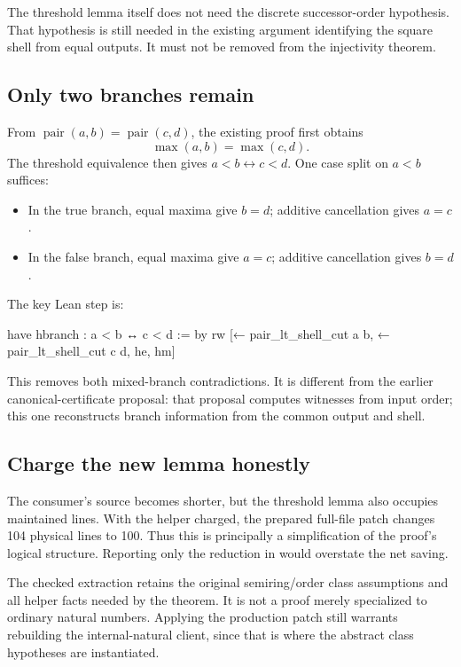 \documentclass[11pt,letterpaper]{article}
\newcommand{\code}[1]{\texttt{\detokenize{#1}}}
\begin{document}
The threshold lemma itself does not need the discrete successor-order hypothesis. That hypothesis is still needed in the existing argument identifying the square shell from equal outputs. It must not be removed from the injectivity theorem.

\subsection{Only two branches remain}

From $\operatorname{pair}(a,b)=\operatorname{pair}(c,d)$, the existing proof first obtains
\[
 \max(a,b)=\max(c,d).
\]
The threshold equivalence then gives $a<b\leftrightarrow c<d$. One case split on $a<b$ suffices:

\begin{itemize}
\item In the true branch, equal maxima give $b=d$; additive cancellation gives $a=c$.
\item In the false branch, equal maxima give $a=c$; additive cancellation gives $b=d$.
\end{itemize}

The key Lean step is:

\begin{Lean}
  have hbranch : a < b ↔ c < d := by
    rw [← pair_lt_shell_cut a b, ← pair_lt_shell_cut c d, he, hm]
\end{Lean}

This removes both mixed-branch contradictions. It is different from the earlier canonical-certificate proposal: that proposal computes witnesses from input order; this one reconstructs branch information from the common output and shell.

\subsection{Charge the new lemma honestly}

The consumer's source becomes shorter, but the threshold lemma also occupies maintained lines. With the helper charged, the prepared full-file patch changes 104 physical lines to 100. Thus this is principally a simplification of the proof's logical structure. Reporting only the reduction in \code{pair_eq_pair_iff} would overstate the net saving.

The checked extraction retains the original semiring/order class assumptions and all helper facts needed by the theorem. It is not a proof merely specialized to ordinary natural numbers. Applying the production patch still warrants rebuilding the internal-natural client, since that is where the abstract class hypotheses are instantiated.
\end{document}
